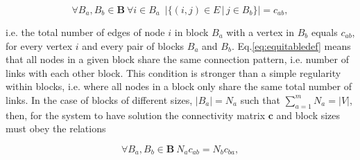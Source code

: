 \documentclass[%
 reprint,
 amsmath,amssymb,
 aps,
 pre,
 showpacs
]{revtex4-1}
\begin{document}
\begin{equation}\label{eq:equitabledef}
\forall B_a,B_b \in \mathbf{B}\:\forall i \in B_a \, \, \,  |\{(i,j) \in E\,|\,j \in B_b \}| = c_{ab},
\end{equation}

i.e. the total number of edges of node $i$ in block $B_a$ with a vertex in $B_b$ equals $c_{ab}$, for every vertex $i$ and every pair of blocks $B_a$ and $B_b$. Eq.\eqref{eq:equitabledef} means that all nodes in a given block share the same connection pattern, i.e. number of links with each other block. This condition is stronger than a simple regularity within blocks, i.e. where all nodes in a block only share the same total number of links. 
In the case of blocks of different sizes, $|B_a|=N_a$ such that $\sum_{a=1}^mN_a=|V|$, then, for the system to have solution the connectivity matrix $\mathbf{c}$ and block sizes must obey the relations

\begin{equation}\label{eq:equitablecon}
\forall B_a,B_b \in \mathbf{B}\:N_ac_{ab} = N_bc_{ba},
\end{equation}
\end{document}

